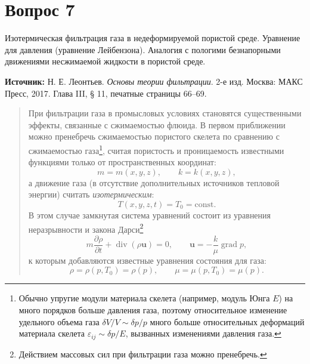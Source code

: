 \documentclass[12pt,a4paper]{article}
\DeclareMathOperator{\grad}{grad}
\DeclareMathOperator{\Div}{div}
\begin{document}
\section*{Вопрос 7}
\noindent Изотермическая фильтрация газа в недеформируемой пористой среде. Уравнение для давления (уравнение Лейбензона). Аналогия с пологими безнапорными движениями несжимаемой жидкости в пористой среде.

\medskip
\noindent\textbf{Источник:} Н. Е. Леонтьев. \textit{Основы теории фильтрации}. 2-е изд. Москва: МАКС Пресс, 2017. Глава III, § 11, печатные страницы 66--69.
\par\bigskip
\begin{quote}\sloppy
При фильтрации газа в промысловых условиях становятся существенными эффекты, связанные с сжимаемостью флюида. В первом приближении можно пренебречь сжимаемостью пористого скелета по сравнению с сжимаемостью газа\footnote{Обычно упругие модули материала скелета (например, модуль Юнга $E$) на много порядков больше давления газа, поэтому относительное изменение удельного объема газа $\delta V/V\sim\delta p/p$ много больше относительных деформаций материала скелета $\varepsilon_{ij}\sim\delta p/E$, вызванных изменениями давления газа.}, считая пористость и проницаемость известными функциями только от пространственных координат:
\[m=m(x,y,z),\qquad k=k(x,y,z),\]
а движение газа (в отсутствие дополнительных источников тепловой энергии) считать \textit{изотермическим}:
\[T(x,y,z,t)=T_0=\mathrm{const}.\]
В этом случае замкнутая система уравнений состоит из уравнения неразрывности и закона Дарси\footnote{Действием массовых сил при фильтрации газа можно пренебречь.}
\[m\frac{\partial\rho}{\partial t}+\Div(\rho\boldsymbol{u})=0,\qquad\boldsymbol{u}=-\frac{k}{\mu}\grad p,\]
к которым добавляются известные уравнения состояния для газа:
\[\rho=\rho(p,T_0)=\rho(p),\qquad\mu=\mu(p,T_0)=\mu(p).\]
\par\nobreak{}\par
\end{quote}
\end{document}
